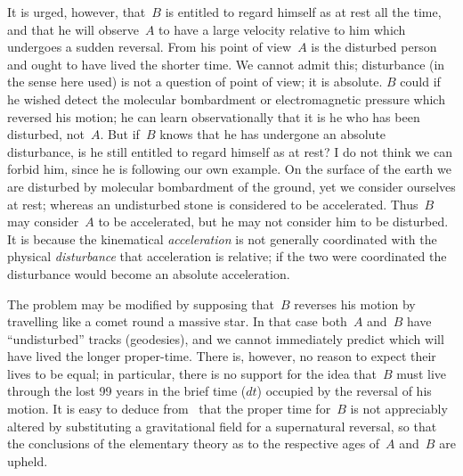 \documentclass[12pt]{book}
\begin{document}
It is urged, however, that~$B$ is entitled to regard himself as at rest all the time,
and that he will observe~$A$ to have a large velocity relative to him which undergoes a sudden reversal.
From his point of view~$A$ is the disturbed person and ought to have lived the shorter time.
We cannot admit this; disturbance (in the sense here used) is not a question of point of view;
it is absolute.
$B$ could if he wished detect the molecular bombardment or electromagnetic pressure which reversed his motion;
he can learn observationally that it is he who has been disturbed, not~$A$.
But if~$B$ knows that he has undergone an absolute disturbance, is he still entitled to regard himself as at rest?
I do not think we can forbid him, since he is following our own example.
On the surface of the earth we are disturbed by molecular bombardment of the ground,
yet we consider ourselves at rest; whereas an undisturbed stone is considered to be accelerated.
Thus~$B$ may consider~$A$ to be accelerated, but he may not consider him to be disturbed.
It is because the kinematical \emph{acceleration} is not generally coordinated with the physical \emph{disturbance}
that acceleration is relative; if the two were coordinated the disturbance would become an absolute acceleration.

The problem may be modified by supposing that~$B$ reverses his motion by travelling like a comet round a massive star.
In that case both~$A$ and~$B$ have ``undisturbed'' tracks (geodesies), and we cannot immediately predict which will
have lived the longer proper-time.
There is, however, no reason to expect their lives to be equal; in particular, there is no support for the idea
that~$B$ must live through the lost 99 years in the brief time ($dt$) occupied by the reversal of his motion.
It is easy to deduce from~ that the proper time for~$B$ is not appreciably altered by substituting
a gravitational field for a supernatural reversal, so that the conclusions of the elementary theory as to the
respective ages of~$A$ and~$B$ are upheld.

\end{document}
